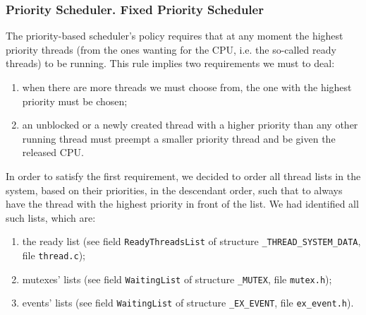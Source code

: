 \subsubsection{Priority Scheduler. Fixed Priority Scheduler}

The priority-based scheduler's policy requires that at any moment the highest priority threads (from the ones wanting for the CPU, i.e. the so-called ready threads) to be running. This rule implies two requirements we must to deal: 
\begin{enumerate}
    \item when there are more threads we must choose from, the one with the highest priority must be chosen;
    
    \item an unblocked or a newly created thread with a higher priority than any other running thread must preempt a smaller priority thread and be given the released CPU.
\end{enumerate}

In order to satisfy the first requirement, we decided to order all thread lists in the system, based on their priorities, in the descendant order, such that to always have the thread with the highest priority in front of the list. We had identified all such lists, which are:
\begin{enumerate}
    \item the ready list (see field \lstinline|ReadyThreadsList| of structure \lstinline|_THREAD_SYSTEM_DATA|, file \lstinline|thread.c|);
    
    \item mutexes' lists (see field \lstinline|WaitingList| of structure \lstinline|_MUTEX|, file \lstinline|mutex.h|);
    
    \item events' lists (see field \lstinline|WaitingList| of structure \lstinline|_EX_EVENT|, file \lstinline|ex_event.h|).
\end{enumerate}

